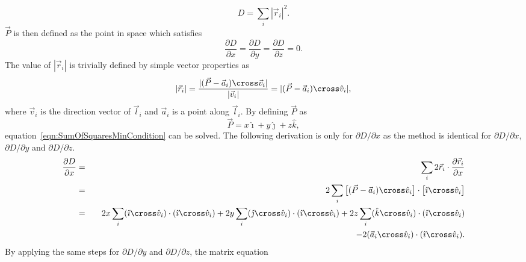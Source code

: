 \begin{equation}
  D = \sum_i |\vec{r}_i|^2.
  \label{eqn:SumOfSquares}
\end{equation}
$\vec{P}$ is then defined as the point in space which satisfies
\begin{equation}
  \frac{\partial D}{\partial x} = \frac{\partial D}{\partial y} = \frac{\partial D}{\partial z} = 0.
  \label{eqn:SumOfSquaresMinCondition}
\end{equation}
The value of $|\vec{r}_i|$ is trivially defined by simple vector properties as 
\begin{equation}
  |\vec{r}_i| = \frac{|(\vec{P} - \vec{a}_i) \cross \vec{v}_i|}{|\vec{v}_i|} = |(\vec{P} - \vec{a}_i) \cross \hat{v}_i|,
  \label{eqn:DistanceOfPointToLine}
\end{equation}
where $\vec{v}_i$ is the direction vector of $\vec{l}_i$ and $\vec{a}_i$ is a point along $\vec{l}_i$.  By defining $\vec{P}$ as
\begin{equation}
  \vec{P} = x\hat{\imath} + y\hat{\jmath} + z\hat{k},
  \label{eqn:PDefinition}
\end{equation}
equation~\ref{eqn:SumOfSquaresMinCondition} can be solved.  The following derivation is only for $\partial D/\partial x$ as the method is identical for $\partial D/\partial x$, $\partial D/\partial y$ and $\partial D/\partial z$.
\begin{eqnarray}
  \frac{\partial D}{\partial x} & = & \sum_i 2\vec{r}_i \cdot \frac{\partial \vec{r}_i}{\partial x} \\
  & = & 2\sum_i \big[(\vec{P} - \vec{a}_i) \cross \hat{v}_i\big] \cdot \big[\hat{\imath} \cross \hat{v}_i\big] \nonumber \\
  & = & 2x \sum_i (\hat{\imath} \cross \hat{v}_i) \cdot ( \hat{\imath} \cross \hat{v}_i) + 2y \sum_i (\hat{\jmath} \cross \hat{v}_i) \cdot ( \hat{\imath} \cross \hat{v}_i) + 2z \sum_i (\hat{k} \cross \hat{v}_i) \cdot ( \hat{\imath} \cross \hat{v}_i) \nonumber \\
  &\qquad & - 2(\vec{a}_i \cross \hat{v}_i) \cdot ( \hat{\imath} \cross \hat{v}_i). \nonumber
  \label{eqn:dDdxDerivation}
\end{eqnarray}
By applying the same steps for $\partial D/\partial y$ and $\partial D/\partial z$, the matrix equation

